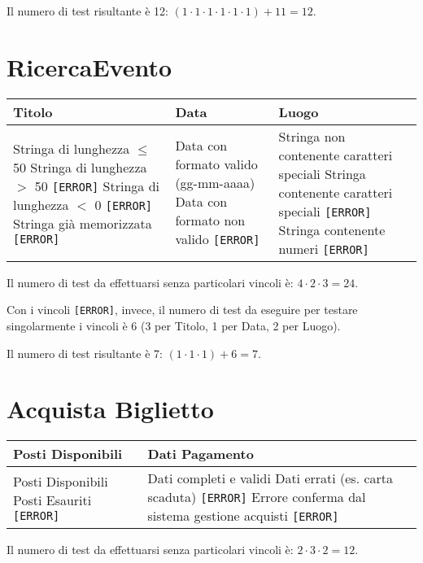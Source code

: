 \noindent Il numero di test risultante è 12: $(1 \cdot 1 \cdot 1 \cdot 1 \cdot 1 \cdot 1) + 11 = 12$.

\section{RicercaEvento}
\begin{table}[H]
	\centering
	\footnotesize
	\renewcommand{\arraystretch}{1.3}
	\begin{tabular}{|p{2.5cm}|p{2.5cm}|p{2.5cm}|}
		\hline
		\textbf{Titolo} & \textbf{Data} & \textbf{Luogo} \\
		\hline
		Stringa di lunghezza $\leq$ 50 \newline
		Stringa di lunghezza $>$ 50 \texttt{[ERROR]} \newline
		Stringa di lunghezza $<$ 0 \texttt{[ERROR]} \newline
		Stringa già memorizzata \texttt{[ERROR]} &
		
		Data con formato valido (gg-mm-aaaa) \newline
		Data con formato non valido \texttt{[ERROR]} &
		
		Stringa non contenente caratteri speciali \newline
		Stringa contenente caratteri speciali \texttt{[ERROR]} \newline
		Stringa contenente numeri \texttt{[ERROR]} \\
		\hline
	\end{tabular}
\end{table}

\noindent Il numero di test da effettuarsi senza particolari vincoli è:
$4 \cdot 2 \cdot 3 = 24$.

\noindent Con i vincoli \texttt{[ERROR]}, invece, il numero di test da eseguire per testare singolarmente i vincoli è 6 (3 per Titolo, 1 per Data, 2 per Luogo).

\noindent Il numero di test risultante è 7: $(1 \cdot 1 \cdot 1) + 6 = 7$.

\section{Acquista Biglietto}
\begin{table}[H]
	\centering
	\footnotesize
	\renewcommand{\arraystretch}{1.3}
	\begin{tabular}{|p{4cm}|p{4cm}|}
		\hline
		\textbf{Posti Disponibili} & \textbf{Dati Pagamento} \\
		\hline
		Posti Disponibili \newline
		Posti Esauriti \texttt{[ERROR]} &
		
		Dati completi e validi \newline
		Dati errati (es. carta scaduta) \texttt{[ERROR]} \newline
		Errore conferma dal sistema gestione acquisti \texttt{[ERROR]} \\
		\hline
	\end{tabular}
\end{table}
\noindent Il numero di test da effettuarsi senza particolari vincoli è:
$2 \cdot 3 \cdot 2 = 12$.

